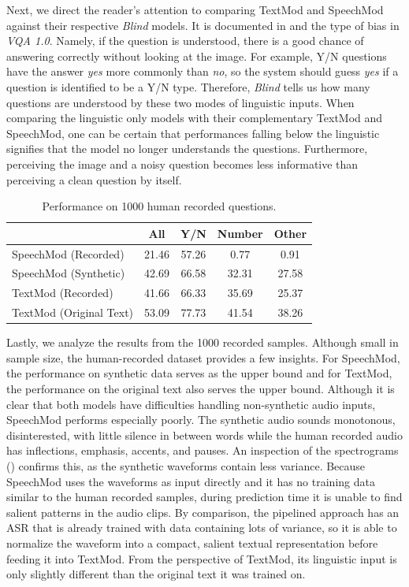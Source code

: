 \documentclass[letterpaper]{article} %
\begin{document}
Next, we direct the reader's attention to comparing TextMod and SpeechMod against their respective \textit{Blind} models. It is documented in  and  the type of bias in \textit{VQA 1.0}. Namely, if the question is understood, there is a good chance of answering correctly without looking at the image. For example, Y/N questions have the answer \emph{yes} more commonly than \emph{no}, so the system should guess \emph{yes} if a question is identified to be a Y/N type. Therefore, \textit{Blind} tells us how many questions are understood by these two modes of linguistic inputs. When comparing the linguistic only models with their complementary TextMod and SpeechMod, one can be certain that performances falling below the linguistic signifies that the model no longer understands the questions. Furthermore, perceiving the image and a noisy question becomes less informative than perceiving a clean question by itself.

\begin{table}[t]
\centering
\caption{Performance on 1000 human recorded questions.}
\label{table:recorded}
\begin{tabular}{l|cccc}
                        & All   & Y/N   & Number & Other \\ \hline
SpeechMod (Recorded)    & 21.46 & 57.26 & 0.77   & 0.91  \\
SpeechMod (Synthetic)   & 42.69 & 66.58 & 32.31  & 27.58 \\ \hline
TextMod (Recorded)      & 41.66 & 66.33 & 35.69  & 25.37 \\
TextMod (Original Text) & 53.09 & 77.73 & 41.54  & 38.26
\end{tabular}
\end{table}

Lastly, we analyze the results from the 1000 recorded samples. Although small in sample size, the human-recorded dataset provides a few insights. For SpeechMod, the performance on synthetic data serves as the upper bound and for TextMod, the performance on the original text also serves the upper bound. Although it is clear that both models have difficulties handling non-synthetic audio inputs, SpeechMod performs especially poorly. The synthetic audio sounds monotonous, disinterested, with little silence in between words while the human recorded audio has inflections, emphasis, accents, and pauses. An inspection of the spectrograms () confirms this, as the synthetic waveforms contain less variance. Because SpeechMod uses the waveforms as input directly and it has no training data similar to the human recorded samples, during prediction time it is unable to find salient patterns in the audio clips. By comparison, the pipelined approach has an ASR that is already trained with data containing lots of variance, so it is able to normalize the waveform into a compact, salient textual representation before feeding it into TextMod. From the perspective of TextMod, its linguistic input is only slightly different than the original text it was trained on.
\end{document}
